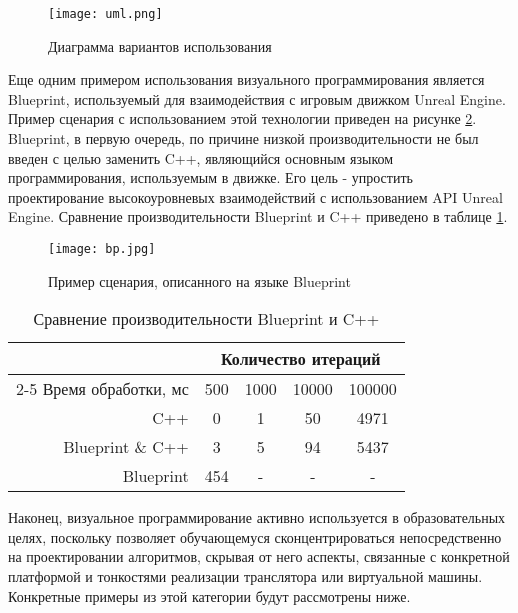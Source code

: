 \begin{figure}[htbp]
	\centering
	\texttt{[image: uml.png]}
	\caption{Диаграмма вариантов использования}%
	\label{fig:uml}
\end{figure}

Еще одним примером использования визуального программирования является Blueprint, используемый для взаимодействия с игровым движком Unreal Engine. Пример сценария с использованием этой технологии приведен на рисунке \ref{fig:bp}. Blueprint, в первую очередь, по причине низкой производительности \cite{bptb} не был введен с целью заменить C++, являющийся основным языком программирования, используемым в движке. Его цель - упростить проектирование высокоуровневых взаимодействий с использованием API Unreal Engine. Сравнение производительности Blueprint и C++ приведено в таблице \ref{table:bptb}.

\begin{figure}[htbp]
	\centering
	\texttt{[image: bp.jpg]}
	\caption{Пример сценария, описанного на языке Blueprint}%
	\label{fig:bp}
\end{figure}

\begin{table}
\captionsetup{skip=5pt}
\caption{Сравнение производительности Blueprint и C++}
\centering
\begin{tabular}{|r|c|c|c|c|}
\hline
            \multirow{2}{*}{} 
           & \multicolumn{4}{c|}{Количество итераций} \\ \cline{2-5}
Время обработки, мс & 500   & 1000  & 10000 & 100000  \\ \hline
C++		  			& 0    	& 1     & 50    & 4971     \\ \hline
Blueprint \& C++	& 3    	& 5     & 94    & 5437     \\ \hline
Blueprint			& 454   & -     & -     & -      \\ \hline
\end{tabular}
\label{table:bptb}
\end{table}

Наконец, визуальное программирование активно используется в образовательных целях, поскольку позволяет обучающемуся сконцентрироваться непосредственно на проектировании алгоритмов, скрывая от него аспекты, связанные с конкретной платформой и тонкостями реализации транслятора или виртуальной машины. Конкретные примеры из этой категории будут рассмотрены ниже.

